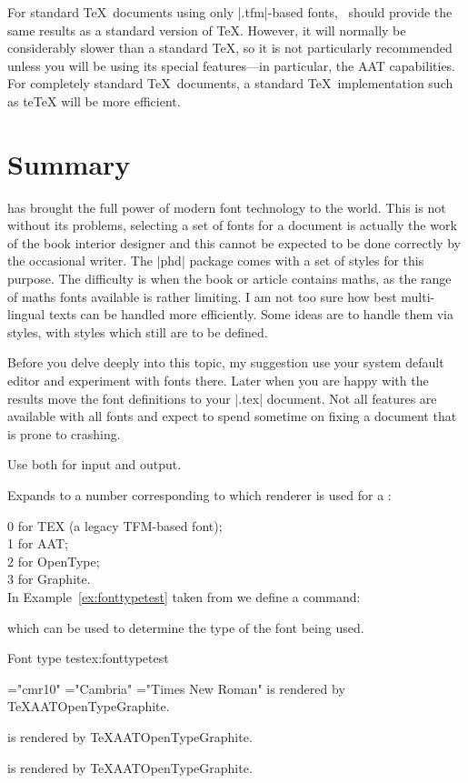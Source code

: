 For standard \TeX\ documents using only |.tfm|-based fonts, \XeTeX\ should provide the same results as a standard version of \TeX. However, it will normally be considerably slower than a standard \TeX, so it is not particularly recommended unless you will be using its special features—in particular, the AAT capabilities. For completely standard \TeX\ documents, a standard \TeX\ implementation such as teTeX will be more efficient.

\section{Summary}


\XeTeX has brought the full power of modern font technology to the \tex world. This is not without its problems, selecting a set of fonts for a document is actually the work of the book interior designer and this cannot be expected to be done correctly by the occasional writer. The |phd| package comes with a set
of styles for this purpose. The difficulty is when the book or article contains maths, as the range of maths fonts available is rather limiting. I am not too sure how best multi-lingual texts can be handled more efficiently. Some ideas are to handle them via styles, with styles which still are to be defined.



Before you delve deeply into this topic, my suggestion use your system default editor and experiment with fonts there. Later when you are happy with the results move the font definitions to your |.tex| document. Not all features are available with all fonts and expect to spend sometime on fixing a document that is prone to crashing.

Use \utfviii both for input and output.

\CMDI{\XeTeXfonttype}
Expands to a number corresponding to which renderer is used for a :

0 for TEX (a legacy TFM-based font);\\
1 for AAT;\\
2 for OpenType;\\
3 for Graphite.\\

In Example~\ref{ex:fonttypetest} taken from \citep{xetexreference} we define a command:

\CMDI{\whattype}

which can be used to determine the type of the font being used.

\begin{texexample}{Font type test}{ex:fonttypetest}
{
\newcommand\whattype[1]{%
  \texttt{\fontname#1} is rendered by
  \ifcase\XeTeXfonttype#1\TeX\or AAT\or OpenType\or Graphite\fi.\par}
\font\1="cmr10"
\font\2="Cambria"
\font\3="Times New Roman"
\whattype\1 \whattype\2 \whattype\3
}
\end{texexample}

